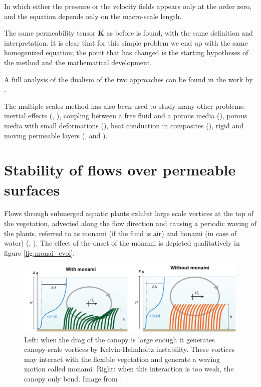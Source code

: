 In which either the pressure or the velocity fields appears only at the order zero, and the equation depends only on the macro-scale length.

The same permeability tensor $\mathbf{K}$ as before is found, with the same definition and interpretation.
It is clear that for this simple problem we end up with the same homogenized equation; the point that has changed is the starting hypotheses of the method and the mathematical development.

A full analysis of the dualism of the two approaches can be found in the work by \citet{davit2013homogenization}.

The multiple scales method has also been used to study many other problems: inertial effects (\citet{mei1991effect}, \citet{skjetne1999new}), coupling between a free fluid and a porous media (\citet{mikelic2000interface}), porous media with small deformations (\citet{auriault1977etude}), heat conduction in composites (\citet{auriault1983effective}), rigid and moving permeable layers (\citet{zampogna2016fluid}, \citet{ugis} and \citet{zampogna2017pelskin}).



\section{Stability of flows over permeable surfaces}
\label{sec:stability}

Flows through submerged aquatic plants exhibit large scale vortices at the top of the vegetation,
advected along the flow direction and causing a periodic waving of the plants, referred to as
monami (if the fluid is air) and honami (in case of water) (\citet{inoue1955studies}, \citet{ackerman1993reduced}).
The effect of the onset of the monami is depicted qualitatively in figure \ref{fig:monai_evol}.

\begin{figure}[h]
	\centering
	\includegraphics[width=1\linewidth]{chapter_1/monami}
	\caption{Left: when the drag of the canopy is large enough it generates canopy-scale vortices by Kelvin-Helmholtz instability. These vortices may interact with the flexible vegetation and generate a waving motion called monami. Right: when this interaction is too weak, the canopy only bend. Image from \citet{nepf2012flow}.}
	\label{fig:monami}
\end{figure}

